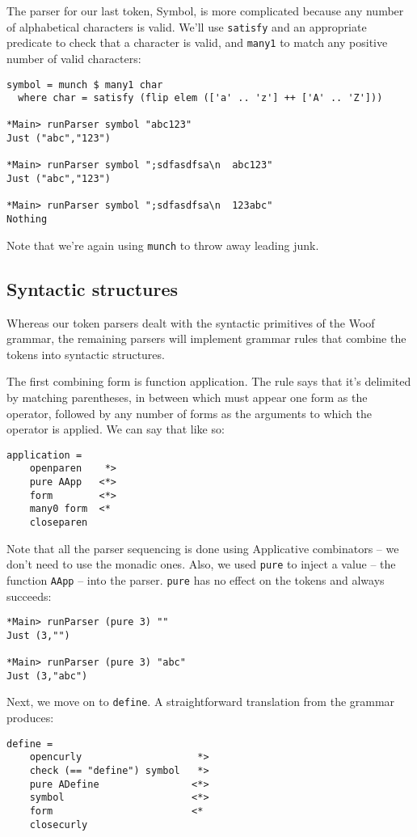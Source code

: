 \documentclass{tmr}
\begin{document}
The parser for our last token, Symbol, is more complicated because any number of
alphabetical characters is valid.  We'll use \verb+satisfy+ and an appropriate
predicate to check that a character is valid, and \verb+many1+ to 
match any positive number of valid characters:
\begin{verbatim}
symbol = munch $ many1 char
  where char = satisfy (flip elem (['a' .. 'z'] ++ ['A' .. 'Z']))

*Main> runParser symbol "abc123"
Just ("abc","123")

*Main> runParser symbol ";sdfasdfsa\n  abc123"
Just ("abc","123")

*Main> runParser symbol ";sdfasdfsa\n  123abc"
Nothing
\end{verbatim}

Note that we're again using \verb+munch+ to throw away leading junk.

\subsection{Syntactic structures}
Whereas our token parsers dealt with the syntactic primitives of the Woof grammar, 
the remaining parsers will implement grammar rules that combine the tokens
into syntactic structures.

The first combining form is function application.  The rule says that it's delimited
by matching parentheses, in between which must appear one form as the operator, followed
by any number of forms as the arguments to which the operator is applied.  We can
say that like so:
\begin{verbatim}
application =
    openparen    *>
    pure AApp   <*>
    form        <*>
    many0 form  <*
    closeparen
\end{verbatim}

Note that all the parser sequencing is done using Applicative
combinators -- we don't need to use the monadic ones.  Also, we used \verb+pure+ 
to inject a value -- the function \verb+AApp+ -- into the parser.  \verb+pure+ 
has no effect on the tokens and always succeeds:
\begin{verbatim}
*Main> runParser (pure 3) ""
Just (3,"")

*Main> runParser (pure 3) "abc"
Just (3,"abc")
\end{verbatim}

Next, we move on to \verb+define+.
A straightforward translation from the grammar produces:
\begin{verbatim}
define =
    opencurly                    *>
    check (== "define") symbol   *>
    pure ADefine                <*>
    symbol                      <*>
    form                        <*
    closecurly
\end{verbatim}
\end{document}
